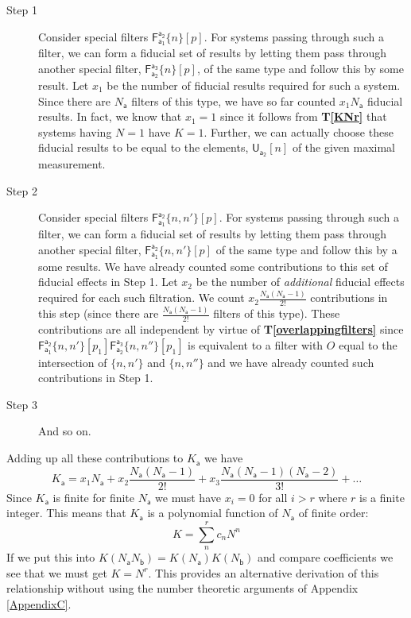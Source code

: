 \documentclass[10pt]{article}
\begin{document}
\begin{description}
\item[Step 1] Consider special filters $\mathsf{F_{a_1}^{a_2}}\{n\}[p]$.  For systems passing through such a filter, we can form a fiducial set of results by letting them pass through another special filter, $\mathsf{F_{a_2}^{a_3}}\{n\}[p]$, of the same type and follow this by some result.  Let $x_1$ be the number of fiducial results required for such a system. Since there are $N_\mathsf{a}$ filters of this type, we have so far counted $x_1N_\mathsf{a}$ fiducial results.  In fact, we know that $x_1=1$ since it follows from {\bf T\ref{KNr}} that systems having $N=1$ have $K=1$.  Further, we can actually choose these fiducial results to be equal to the elements, $\mathsf{U_{a_2}}[n]$ of the given maximal measurement.
\item[Step 2] Consider special filters $\mathsf{F_{a_1}^{a_2}}\{n, n'\}[p]$.  For systems passing through such a filter, we can form a fiducial set of results by letting them pass through another special filter, $\mathsf{F_{a_1}^{a_2}}\{n, n'\}[p]$ of the same type and follow this by a some results.  We have already counted some contributions to this set of fiducial effects in Step 1.  Let $x_2$ be the number of \emph{additional} fiducial effects required for each such filtration.   We count $x_2\frac{N_\mathsf{a}(N_\mathsf{a}-1)}{2!}$ contributions in this step (since there are $\frac{N_\mathsf{a}(N_\mathsf{a}-1)}{2!}$ filters of this type).  These contributions are all independent by virtue of {\bf T\ref{overlappingfilters}} since $\mathsf{F_{a_1}^{a_2}}\{n,n'\}[p_1]\mathsf{F_{a_2}^{a_3}}\{n, n''\}[p_1]$ is equivalent to a filter with $O$ equal to the intersection of $\{n, n'\}$ and $\{ n, n'' \}$ and we have already counted such contributions in Step 1.
\item[Step 3]  And so on.
\end{description}
Adding up all these contributions to $K_\mathsf{a}$ we have
\begin{equation}\label{sigexpan}
K_\mathsf{a} = x_1 N_\mathsf{a} + x_2\frac{N_\mathsf{a}(N_\mathsf{a}-1)}{2!} + x_3\frac{N_\mathsf{a}(N_\mathsf{a}-1)(N_\mathsf{a}-2)}{3!} + \dots
\end{equation}
Since $K_\mathsf{a}$ is finite for finite $N_\mathsf{a}$ we must have $x_i=0$ for all $i>r$ where $r$ is a finite integer.  This means that $K_\mathsf{a}$ is a polynomial function of $N_\mathsf{a}$ of finite order:
\begin{equation}
K=\sum_n^r c_n N^n
\end{equation}
If we put this into $K(N_\mathsf{a}N_\mathsf{b})=K(N_\mathsf{a})K(N_\mathsf{b})$ and compare coefficients we see that we must get $K=N^r$.  This provides an alternative derivation of this relationship without using the number theoretic arguments of Appendix \ref{AppendixC}.
\end{document}
